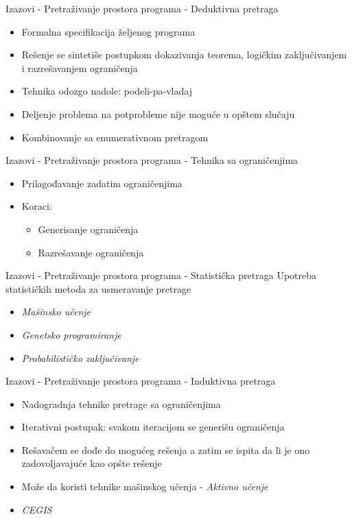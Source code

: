 \begin{frame}{Izazovi - Pretraživanje prostora programa - Deduktivna pretraga}
    \begin{itemize}
        \item Formalna specifikacija željenog programa
        \item Rešenje se sintetiše postupkom dokazivanja teorema, logičkim zaključivanjem i razrešavanjem ograničenja
        \item Tehnika odozgo nadole: podeli-pa-vladaj
        \item Deljenje problema na potprobleme nije moguće u opštem slučaju
        \item Kombinovanje sa enumerativnom pretragom
    \end{itemize}
\end{frame}

\begin{frame}{Izazovi - Pretraživanje prostora programa - Tehnika sa ograničenjima}
    \begin{itemize}
        \item Prilagođavanje zadatim ograničenjima
        \item Koraci:
            \begin{itemize}
                \item Generisanje ograničenja
                \item Razrešavanje ograničenja
            \end{itemize}
    \end{itemize}
\end{frame}


\begin{frame}{Izazovi - Pretraživanje prostora programa - Statistička pretraga}
    Upotreba statističkih metoda za usmeravanje pretrage
    \begin{itemize}
        \item \emph{Mašinsko učenje}
        \item \emph{Genetsko programiranje}
        \item \emph{Probabilističko zaključivanje}
    \end{itemize}
\end{frame}


\begin{frame}{Izazovi - Pretraživanje prostora programa - Induktivna pretraga}
    \begin{itemize}
        \item Nadogradnja tehnike pretrage sa ograničenjima
        \item Iterativni postupak: svakom iteracijom se generišu ograničenja
        \item Rešavačem se dođe do mogućeg rešenja a zatim se ispita da li je ono zadovoljavajuće kao opšte rešenje
        \item Može da koristi tehnike mašinskog učenja - \emph{Aktivno učenje}
        \item \emph{CEGIS}
    \end{itemize}
\end{frame}
